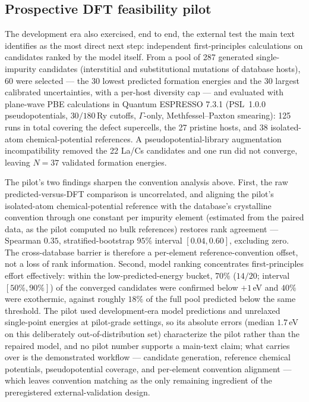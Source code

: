 \documentclass[aps,prb,onecolumn,superscriptaddress,floatfix]{revtex4-2}
\begin{document}
\subsection{Prospective DFT feasibility pilot}

The development era also exercised, end to end, the external test the main
text identifies as the most direct next step: independent first-principles
calculations on candidates ranked by the model itself.  From a pool of 287
generated single-impurity candidates (interstitial and substitutional
mutations of database hosts), 60 were selected --- the 30 lowest predicted
formation energies and the 30 largest calibrated uncertainties, with a
per-host diversity cap --- and evaluated with plane-wave PBE calculations
in Quantum ESPRESSO 7.3.1 (PSL~1.0.0 pseudopotentials, $30/180$\,Ry
cutoffs, $\Gamma$-only, Methfessel--Paxton smearing): 125 runs in total
covering the defect supercells, the 27 pristine hosts, and 38
isolated-atom chemical-potential references.  A pseudopotential-library
augmentation incompatibility removed the 22 La/Cs candidates and one run
did not converge, leaving $N=37$ validated formation energies.

The pilot's two findings sharpen the convention analysis above.  First,
the raw predicted-versus-DFT comparison is uncorrelated, and aligning the
pilot's isolated-atom chemical-potential reference with the database's
crystalline convention through one constant per impurity element
(estimated from the paired data, as the pilot computed no bulk references)
restores rank agreement --- Spearman $0.35$, stratified-bootstrap $95\%$
interval $[0.04, 0.60]$, excluding zero.  The cross-database barrier is
therefore a per-element reference-convention offset, not a loss of rank
information.  Second, model ranking concentrates first-principles effort
effectively: within the low-predicted-energy bucket, $70\%$ ($14/20$;
interval $[50\%, 90\%]$) of the converged candidates were confirmed below
$+1$\,eV and $40\%$ were exothermic, against roughly $18\%$ of the full
pool predicted below the same threshold.  The pilot used development-era
model predictions and unrelaxed single-point energies at pilot-grade
settings, so its absolute errors (median $1.7$\,eV on this deliberately
out-of-distribution set) characterize the pilot rather than the repaired
model, and no pilot number supports a main-text claim; what carries over
is the demonstrated workflow --- candidate generation, reference
chemical potentials, pseudopotential coverage, and per-element convention
alignment --- which leaves convention matching as the only remaining
ingredient of the preregistered external-validation design.
\end{document}
